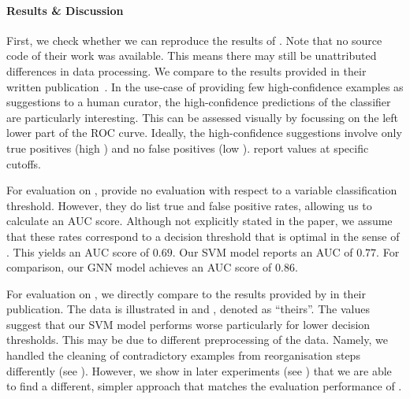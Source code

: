 \documentclass[
	fontsize=10pt, %
	twoside=true, %
	secnumdepth=1, %
  toc=indentunnumbered %
]{kaobook}
\begin{document}
\paragraph{Results \& Discussion}

First, we check whether we can reproduce the results of \nielsen{}. Note that no
source code of their work was available. This means there may still be
unattributed differences in data processing. We compare to the results
provided in their written publication~\cite{nielsen_MachineLearningSupport_2019}. In the
use-case of providing few high-confidence examples as suggestions to a human
curator, the high-confidence predictions of the classifier are particularly
interesting. This can be assessed visually by focussing on the left lower part
of the ROC curve.
Ideally, the high-confidence suggestions involve only true
positives (high \TPR{}) and no false positives (low \FPR{}).
\nielsen{} report \FPR{} values at specific \TPR{} cutoffs.

For evaluation on \PDMap{}, \nielsen{} provide no evaluation with respect to a
variable classification threshold. However, they do list true and false positive
rates, allowing us to calculate an AUC score. Although not explicitly stated in
the paper, we assume that these rates correspond to a decision threshold  
 that is optimal in the sense of . This yields an
 AUC score of $0.69$. Our SVM model reports an AUC of $0.77$. For comparison,
 our GNN model achieves an AUC score of $0.86$.

 For evaluation on \ReconMap{}, we directly compare to the results provided by
 \nielsen{} in their publication. The data is illustrated in
  and ,
 denoted as ``theirs''.
 The values suggest that our SVM model performs worse particularly for lower
 decision thresholds. This may be due to different preprocessing of the data.
 Namely, we handled the cleaning of contradictory examples from reorganisation
 steps differently (see ). However, we show in later
 experiments (see ) that we are able to
 find a different, simpler approach that matches the evaluation performance of
 \nielsen{}.
 
\end{document}
